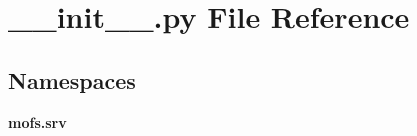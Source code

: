 \section{\-\_\-\-\_\-init\-\_\-\-\_\-.\-py File Reference}
\label{srv_2____init_____8py}
\subsection*{Namespaces}
\begin{DoxyCompactItemize}
\item 
{\bf mofs.\-srv}
\end{DoxyCompactItemize}
